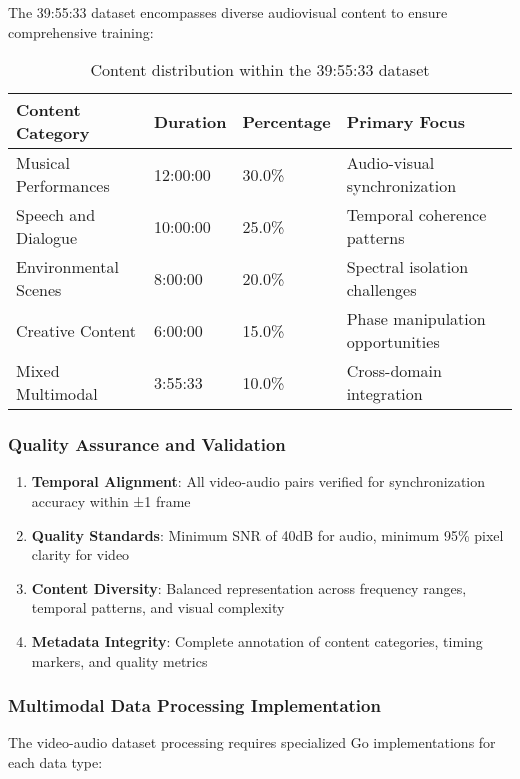 The 39:55:33 dataset encompasses diverse audiovisual content to ensure comprehensive training:

\begin{table}[h]
\centering
\begin{tabular}{|l|l|l|l|}
\hline
\textbf{Content Category} & \textbf{Duration} & \textbf{Percentage} & \textbf{Primary Focus} \\
\hline
Musical Performances & 12:00:00 & 30.0\% & Audio-visual synchronization \\
\hline
Speech and Dialogue & 10:00:00 & 25.0\% & Temporal coherence patterns \\
\hline
Environmental Scenes & 8:00:00 & 20.0\% & Spectral isolation challenges \\
\hline
Creative Content & 6:00:00 & 15.0\% & Phase manipulation opportunities \\
\hline
Mixed Multimodal & 3:55:33 & 10.0\% & Cross-domain integration \\
\hline
\end{tabular}
\caption{Content distribution within the 39:55:33 dataset}
\end{table}

\subsubsection{Quality Assurance and Validation}

\begin{enumerate}
    \item \textbf{Temporal Alignment}: All video-audio pairs verified for synchronization accuracy within ±1 frame
    \item \textbf{Quality Standards}: Minimum SNR of 40dB for audio, minimum 95\% pixel clarity for video
    \item \textbf{Content Diversity}: Balanced representation across frequency ranges, temporal patterns, and visual complexity
    \item \textbf{Metadata Integrity}: Complete annotation of content categories, timing markers, and quality metrics
\end{enumerate}

\subsubsection{Multimodal Data Processing Implementation}

The video-audio dataset processing requires specialized Go implementations for each data type:

